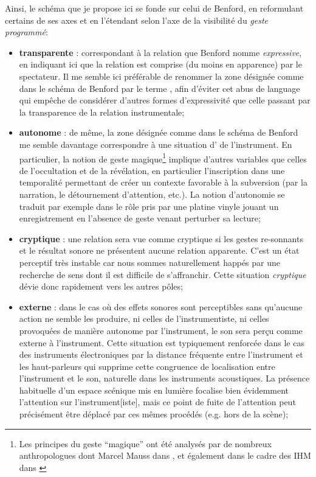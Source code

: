 \noindent Ainsi, le schéma que je propose ici se fonde sur celui de Benford, en reformulant certains de ses axes et en l'étendant selon l'axe de la visibilité du \textit{geste programmé}:
\vspace{-1em}
\begin{itemize}[noitemsep]
	\item \textbf{transparente} : correspondant à la relation que Benford nomme \textit{expressive}, en indiquant ici que la relation est comprise (du moins en apparence) par le spectateur. Il me semble ici préférable de renommer la zone désignée comme  dans le schéma de Benford par le terme , afin d'éviter cet abus de language qui empêche de considérer d'autres formes d'expressivité que celle passant par la transparence de la relation instrumentale;
	\item \textbf{autonome} : de même, la zone désignée comme  dans le schéma de Benford me semble davantage correspondre à une situation d' de l'instrument. En particulier, la notion de geste magique\footnote{Les principes du geste ``magique'' ont été analysés par de nombreux anthropologues dont Marcel Mauss dans \cite{mauss_esquisse_1902}, et également dans le cadre des \gls{IHM} dans \cite{lokuge_dynamic_1995, marshall_deception_2010}} implique d'autres variables que celles de l'occultation et de la révélation, en particulier l'inscription dans une temporalité permettant de créer un contexte favorable à la subversion (par la narration, le détournement d'attention, etc.). La notion d'autonomie se traduit par exemple dans le rôle pris par une platine vinyle jouant un enregistrement en l'absence de geste venant perturber sa lecture;
	\item \textbf{cryptique} : une relation sera vue comme cryptique si les gestes re-sonnants et le résultat sonore ne présentent aucune relation apparente. C'est un état perceptif très instable car nous sommes naturellement happés par une recherche de sens dont il est difficile de s'affranchir. Cette situation \textit{cryptique} dévie donc rapidement vers les autres pôles;
	\item \textbf{externe} : dans le cas où des effets sonores sont perceptibles sans qu'aucune action ne semble les produire, ni celles de l'instrumentiste, ni celles provoquées de manière autonome par l'instrument, le son sera perçu comme externe à l'instrument. Cette situation est typiquement renforcée dans le cas des instruments électroniques par la distance fréquente entre l'instrument et les haut-parleurs qui supprime cette congruence de localisation entre l'instrument et le son, naturelle dans les instruments acoustiques. La présence habituelle d'un espace scénique mis en lumière focalise bien évidemment l'attention sur l'instrument[iste], mais ce point de fuite de l'attention peut précisément être déplacé par ces mêmes procédés (e.g. hors de la scène);

\end{itemize}
